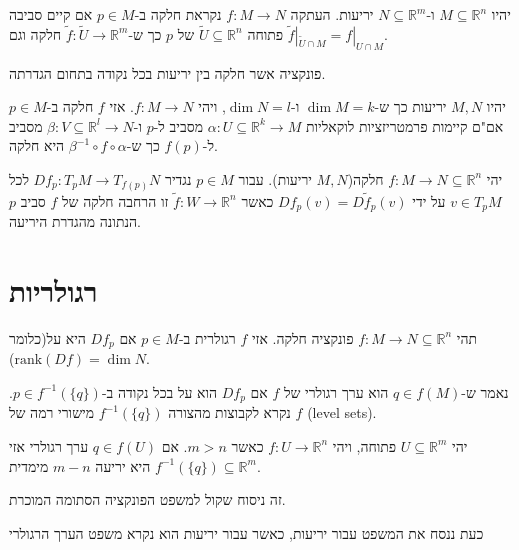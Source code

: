 \documentclass{tstextbook}
\begin{document}
\begin{definition}
יהיו \(M\subseteq \mathbb{R}^{n}\) ו-\(N\subseteq \mathbb{R}^{m}\) יריעות. העתקה \(f:M\to N\) נקראת חלקה ב-\(p \in M\) אם קיים סביבה פתוחה \(\tilde{U} \subseteq \mathbb{R}^{n}\) של \(p\) כך ש-\(\tilde{f}:\tilde{U}\to \mathbb{R}^{m}\) חלקה וגם \(\tilde{f}|_{\tilde{U}\cap M}=f|_{U\cap M}\).

\end{definition}
\begin{definition}
פונקציה אשר חלקה בין יריעות בכל נקודה בתחום הגדרתה.

\end{definition}
\begin{proposition}
יהיו \(M,N\) יריעות כך ש-\(\dim M=k\) ו-\(\dim N =l\), ויהי \(f:M\to N\). אזי \(f\) חלקה ב-\(p \in M\) אם"ם קיימות פרמטריזציות לוקאליות \(\alpha:U\subseteq \mathbb{R}^{k}\to M\) מסביב ל-\(p\) ו-\(\beta:V\subseteq \mathbb{R}^{l}\to N\) מסביב ל-\(f(p)\) כך ש-\(\beta ^{-1}\circ f \circ \alpha\) היא חלקה.

\end{proposition}
\begin{definition}
יהי \(f:M\to N\subseteq \mathbb{R}^{n}\) חלקה(\(M,N\) יריעות). עבור \(p \in M\) נגדיר \(Df_{p}:T_{p}M\to T_{f(p)}N\) לכל \(v \in T_{p}M\) על ידי \(Df_{p}(v)=D\tilde{f}_{p}(v)\) כאשר \(\tilde{f}:W\to \mathbb{R}^{n}\) זו הרחבה חלקה של \(f\) סביב \(p\) הנתונה מהגדרת היריעה. 

\end{definition}
\section{רגולריות}

\begin{definition}
תהי \(f:M\to N\subseteq \mathbb{R}^{n}\) פונקציה חלקה. אזי \(f\) רגולרית ב-\(p \in M\) אם \(Df_{p}\) היא על(כלומר \(\text{rank}(Df)=\dim N\)).

\end{definition}
\begin{definition}
נאמר ש-\(q \in f(M)\) הוא ערך רגולרי של \(f\) אם \(Df_{p}\) הוא על בכל נקודה ב-\(p \in f^{-1}(\{ q \})\). נקרא לקבוצות מהצורה \(f^{-1}(\{ q \})\) מישורי רמה של \(f\) (level sets).

\end{definition}
\begin{theorem}
יהי \(U\subseteq \mathbb{R}^{m}\) פתוחה, ויהי \(f:U\to \mathbb{R}^{n}\) כאשר \(m> n\). אם \(q \in f(U)\) ערך רגולרי אזי \(f^{-1}(\{ q \})\subseteq \mathbb{R}^{m}\) היא יריעה \(m-n\) מימדית.

\end{theorem}
\begin{remark}
זה ניסוח שקול למשפט הפונקציה הסתומה המוכרת.

\end{remark}
כעת ננסח את המשפט עבור יריעות, כאשר עבור יריעות הוא נקרא משפט הערך הרגולרי
\end{document}
